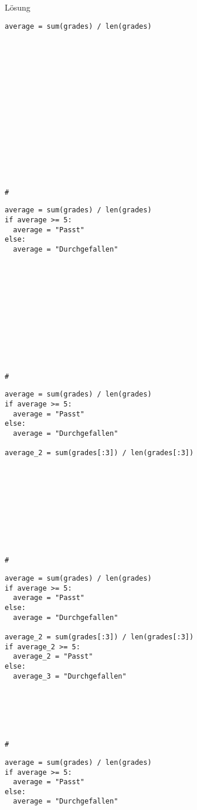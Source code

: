 \begin{fragile}{}
\begin{block}{Lösung }
\vspace{2pt}
\begin{overprint}
\begin{verbatim}
average = sum(grades) / len(grades)
   
   














#   
\end{verbatim}
\begin{verbatim}
average = sum(grades) / len(grades)
if average >= 5: 
  average = "Passt"
else: 
  average = "Durchgefallen"
  
  
  
  
  
  
  
  
  
  
  
  
#  
\end{verbatim}
\begin{verbatim}
average = sum(grades) / len(grades)
if average >= 5: 
  average = "Passt"
else: 
  average = "Durchgefallen"

average_2 = sum(grades[:3]) / len(grades[:3])










#
\end{verbatim}
\begin{verbatim}
average = sum(grades) / len(grades)
if average >= 5: 
  average = "Passt"
else: 
  average = "Durchgefallen"

average_2 = sum(grades[:3]) / len(grades[:3])
if average_2 >= 5:
  average_2 = "Passt"
else: 
  average_3 = "Durchgefallen"






#
\end{verbatim}
\begin{verbatim}
average = sum(grades) / len(grades)
if average >= 5: 
  average = "Passt"
else: 
  average = "Durchgefallen"


\end{verbatim}
\end{overprint}
\end{block}
\end{fragile}
